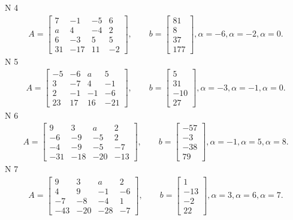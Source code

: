 \documentclass[11pt]{report}
\begin{document}
N 4
\begin{align*}
 A = \left[\begin{matrix}7 & -1 & -5 & 6\\a & 4 & -4 & 2\\6 & -3 & 5 & 5\\31 & -17 & 11 & -2\end{matrix}\right],
    \qquad b = \left[\begin{matrix}81\\8\\37\\177\end{matrix}\right], \alpha = -6, \alpha = -2, \alpha = 0. 
 \end{align*}
N 5
\begin{align*}
 A = \left[\begin{matrix}-5 & -6 & a & 5\\3 & -7 & 4 & -1\\2 & -1 & -1 & -6\\23 & 17 & 16 & -21\end{matrix}\right],
    \qquad b = \left[\begin{matrix}5\\31\\-10\\27\end{matrix}\right], \alpha = -3, \alpha = -1, \alpha = 0. 
 \end{align*}
N 6
\begin{align*}
 A = \left[\begin{matrix}9 & 3 & a & 2\\-6 & -9 & -5 & 2\\-4 & -9 & -5 & -7\\-31 & -18 & -20 & -13\end{matrix}\right],
    \qquad b = \left[\begin{matrix}-57\\-3\\-38\\79\end{matrix}\right], \alpha = -1, \alpha = 5, \alpha = 8. 
 \end{align*}
N 7
\begin{align*}
 A = \left[\begin{matrix}9 & 3 & a & 2\\4 & 9 & -1 & -6\\-7 & -8 & -4 & 1\\-43 & -20 & -28 & -7\end{matrix}\right],
    \qquad b = \left[\begin{matrix}1\\-13\\-2\\22\end{matrix}\right], \alpha = 3, \alpha = 6, \alpha = 7. 
 \end{align*}
\end{document}
